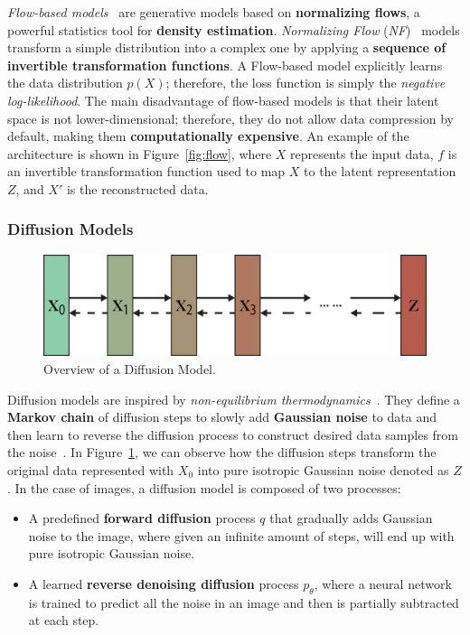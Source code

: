 \documentclass[preprint]{elsarticle}
\begin{document}
\emph{Flow-based models}~\cite{weng2018flow} are generative models based on \textbf{normalizing flows}, a powerful statistics tool for \textbf{density estimation}.
\emph{Normalizing Flow} (\emph{NF})~\cite{rezende2016variational} models transform a simple distribution into a complex one by applying a \textbf{sequence of invertible transformation functions}. 
A Flow-based model explicitly learns the data distribution $p(X)$; therefore, the loss function is simply the \emph{negative log-likelihood}.
The main disadvantage of flow-based models is that their latent space is not lower-dimensional;  therefore, they do not allow data compression by default, making them \textbf{computationally expensive}. An example of the architecture is shown in Figure~\ref{fig:flow}, where $X$ represents the input data, $f$ is an invertible transformation function used to map $X$ to the latent representation $Z$, and $X'$ is the reconstructed data.  


\subsubsection{Diffusion Models}\label{sec:diff}

\begin{figure}[t]
	\centering
    \includegraphics[scale=0.8]{img/svg/DIFF.png}
    \caption{Overview of a Diffusion Model.}\label{fig:diff-arch}
\end{figure}


Diffusion models are inspired by \emph{non-equilibrium thermodynamics}~\cite{V_n_2020}. 
They define a \textbf{Markov chain} of diffusion steps to slowly 
add \textbf{Gaussian noise} to data and then learn to reverse the diffusion process to construct desired data samples from the noise~\cite{weng2021diffusion}. 
In Figure~\ref{fig:diff-arch}, we can observe how the diffusion steps transform the original data represented with $X_0$ into pure isotropic Gaussian noise denoted as $Z$. 
In the case of images, a diffusion model is composed of two processes:

\begin{itemize}
	\item A predefined \textbf{forward diffusion} process $q$ that gradually adds Gaussian noise to the image, where given an infinite amount of steps, will end up with pure isotropic Gaussian noise. 
	\item A learned \textbf{reverse denoising diffusion} process $p_\theta$, where a neural network is trained to predict all the noise in an image and then is partially subtracted at each step.
\end{itemize}
\end{document}
